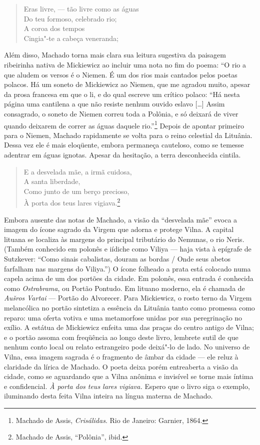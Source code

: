\begin{verse}
Eras livre, --- tão livre como as águas \\
Do teu formoso, celebrado rio;\\
A coroa dos tempos\\
Cingia"-te a cabeça veneranda;
\end{verse}

Além disso, Machado torna mais clara sua leitura sugestiva da paisagem
ribeirinha nativa de Mickiewicz ao incluir uma nota no fim do poema: ``O
rio a que aludem os versos é o Niemen. É um dos rios mais cantados pelos
poetas polacos. Há um soneto de Mickiewicz ao Niemen, que me agradou
muito, apesar da prosa francesa em que o li, e do qual escreve um
crítico polaco: ``Há nesta página uma cantilena a que não resiste nenhum
ouvido eslavo {[}\ldots{}{]} Assim consagrado, o soneto de Niemen correu
toda a Polônia, e só deixará de viver quando deixarem de correr as águas
daquele rio.''\footnote{Machado de Assis, \textit{Crisálidas}. Rio de Janeiro: Garnier, 1864.} Depois de apontar primeiro para o Niemen,
Machado rapidamente se volta para o reino celestial da Lituânia. Dessa
vez ele é mais eloqüente, embora permaneça cauteloso, como se temesse
adentrar em águas ignotas. Apesar da hesitação, a terra desconhecida
cintila.

\begin{verse}
E a desvelada mãe, a irmã cuidosa,\\
\quad A santa liberdade,\\
Como junto de um berço precioso,\\
À porta dos teus lares vigiava.\footnote{Machado de Assis, ``Polônia'', ibid.}
\end{verse}

Embora ausente das notas de Machado, a visão da ``desvelada mãe'' evoca
a imagem do ícone sagrado da Virgem que adorna e protege Vilna. A
capital lituana se localiza às margens do principal tributário do
Nemunas, o rio Neris. (Também conhecido em polonês e iídiche como Viliya
--- haja vista à epígrafe de Sutzkever: ``Como sinais cabalistas, douram
as bordas / Onde seus abetos farfalham nas margens do Viliya.'') O ícone
folheado a prata está colocado numa capela acima de um dos portões da
cidade. Em polonês, essa entrada é conhecida como \textit{Ostrabrama}, ou
Portão Pontudo. Em lituano moderno, ela é chamada de \textit{Aušros
Vartai} --- Portão do Alvorecer. Para Mickiewicz, o rosto terno da Virgem
melancólica no portão sintetiza a essência da Lituânia tanto como
promessa como reparo: uma oferta votiva e uma metamorfose unidas por sua
peregrinação no exílio. A estátua de Mickiewicz enfeita uma das praças
do centro antigo de Vilna; e o portão assoma com freqüência ao longo
deste livro, lembrete sutil de que nenhum conto local ou relato
estrangeiro pode deixá"-lo de lado. No universo de Vilna, essa imagem
sagrada é o fragmento de âmbar da cidade --- ele reluz à claridade da
lírica de Machado. O poeta deixa porém entreaberta a visão da cidade,
como se aguardando que a Vilna anônima e invisível se torne mais íntima
e confidencial. \textit{À porta dos teus lares vigiava.} Espero que o
livro siga o exemplo, iluminando desta feita Vilna inteira na língua
materna de Machado.
